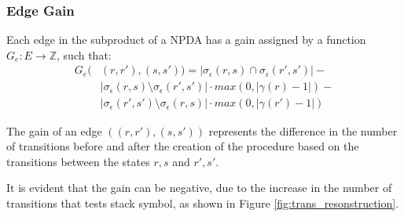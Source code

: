         \subsubsection*{Edge Gain}
            Each edge in the subproduct of a NPDA has a gain assigned by a function $G_e: E \rightarrow \mathbb{Z}$, such that:
            $$
            \begin{aligned}
                G_e(&(r, r'), (s, s')) = |\sigma_\epsilon(r, s) \cap \sigma_\epsilon(r', s')| -\\
                & |\sigma_\epsilon(r, s) \setminus \sigma_\epsilon(r', s')| \cdot max(0, |\gamma(r)-1|) - \\
                & |\sigma_\epsilon(r', s') \setminus \sigma_\epsilon(r, s)| \cdot max(0, |\gamma(r')-1|)
            \end{aligned}
            $$

            The gain of an edge $((r, r'), (s, s'))$ represents the difference in the number of transitions before and after the creation of the procedure based on the transitions between the states $r, s$ and $r', s'$.

            It is evident that the gain can be negative, due to the increase in the number of transitions that tests stack symbol, as shown in Figure \ref{fig:trans_resonstruction}.

